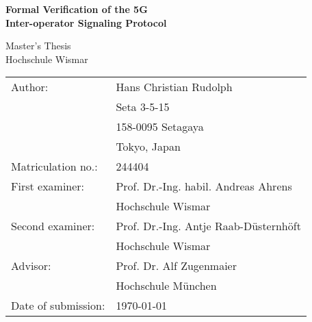 \begin{titlepage}
\centering

\vspace*{3cm}

{
    \Huge{
        \textbf{Formal Verification of the 5G\\
        \vspace{4mm}
        Inter-operator Signaling Protocol}
    }
}

\vspace{1cm}

\centering

\LARGE
Master's Thesis\\
Hochschule Wismar

\vspace{2cm}

\vfill
{
    \renewcommand{\arraystretch}{1.1}
    {

    \begin{table}[h!]
    \centering
    \large
    \begin{tabular}{ll}
    Author:             & Hans Christian Rudolph               \\
                        & Seta 3-5-15                          \\
                        & 158-0095 Setagaya                    \\
                        & Tokyo, Japan                         \\
        Matriculation no.:  & 244404                           \vspace{3mm}\\
    First examiner:     & Prof. Dr.-Ing. habil. Andreas Ahrens \\
                        & Hochschule Wismar                    \\
    Second examiner:    & Prof. Dr.-Ing. Antje Raab-Düsternhöft\\
                        & Hochschule Wismar                    \\
    Advisor:            & Prof. Dr. Alf Zugenmaier             \\\vspace{3mm}
                        & Hochschule München                   \\
    Date of submission: & \today
    \end{tabular}
    \end{table}
    }
}

\vspace{2cm}

\end{titlepage}

